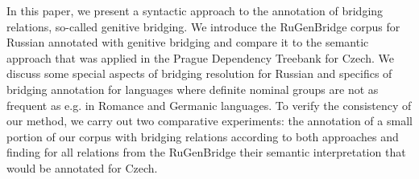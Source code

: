 In this paper, we present a syntactic approach to the annotation of bridging relations, so-called genitive bridging. We introduce the RuGenBridge corpus for Russian annotated with genitive bridging and compare it to the semantic approach that was applied in the Prague Dependency Treebank for Czech. We discuss some special aspects of bridging resolution for Russian and specifics of bridging annotation for languages where definite nominal groups are not as frequent as e.g. in Romance and Germanic languages. To verify the consistency of our method, we carry out two comparative experiments: the annotation of a small portion of our corpus with bridging relations according to both approaches and finding for all relations from the RuGenBridge their semantic interpretation that would be annotated for Czech.
